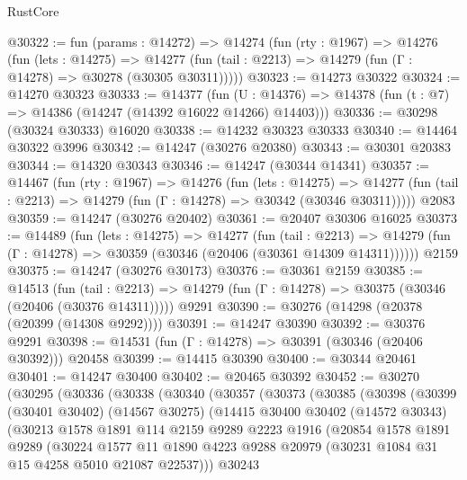 \begin{lexlean}{RustCore}
\begin{coremodule}
@30322 := fun (params : @14272) =>
  @14274
    (fun (rty : @1967) =>
    @14276
      (fun (lets : @14275) =>
      @14277 (fun (tail : @2213) => @14279 (fun (Γ : @14278) => @30278 (@30305 @30311)))))
@30323 := @14273 @30322
@30324 := @14270 @30323
@30333 := @14377
    (fun (U : @14376) => @14378 (fun (t : @7) => @14386 (@14247 (@14392 @16022 @14266) @14403)))
@30336 := @30298 (@30324 @30333) @16020
@30338 := @14232 @30323 @30333
@30340 := @14464 @30322 @3996
@30342 := @14247 (@30276 @20380)
@30343 := @30301 @20383
@30344 := @14320 @30343
@30346 := @14247 (@30344 @14341)
@30357 := @14467
    (fun (rty : @1967) =>
    @14276
      (fun (lets : @14275) =>
      @14277 (fun (tail : @2213) => @14279 (fun (Γ : @14278) => @30342 (@30346 @30311)))))
    @2083
@30359 := @14247 (@30276 @20402)
@30361 := @20407 @30306 @16025
@30373 := @14489
    (fun (lets : @14275) =>
    @14277
      (fun (tail : @2213) =>
      @14279 (fun (Γ : @14278) => @30359 (@30346 (@20406 (@30361 @14309 @14311))))))
    @2159
@30375 := @14247 (@30276 @30173)
@30376 := @30361 @2159
@30385 := @14513
    (fun (tail : @2213) => @14279 (fun (Γ : @14278) => @30375 (@30346 (@20406 (@30376 @14311)))))
    @9291
@30390 := @30276 (@14298 (@20378 (@20399 (@14308 @9292))))
@30391 := @14247 @30390
@30392 := @30376 @9291
@30398 := @14531 (fun (Γ : @14278) => @30391 (@30346 (@20406 @30392))) @20458
@30399 := @14415 @30390
@30400 := @30344 @20461
@30401 := @14247 @30400
@30402 := @20465 @30392
@30452 := @30270
    (@30295
      (@30336
        (@30338
          (@30340
            (@30357
              (@30373
                (@30385
                  (@30398
                    (@30399
                      (@30401 @30402)
                      (@14567 @30275)
                      (@14415
                        @30400
                        @30402
                        (@14572 @30343)
                        (@30213
                          @1578
                          @1891
                          @114
                          @2159
                          @9289
                          @2223
                          @1916
                          (@20854
                            @1578
                            @1891
                            @9289
                            (@30224
                              @1577
                              @11
                              @1890
                              @4223
                              @9288
                              @20979
                              (@30231 @1084 @31 @15 @4258 @5010 @21087 @22537)))
                          @30243

\end{coremodule}
\end{lexlean}
